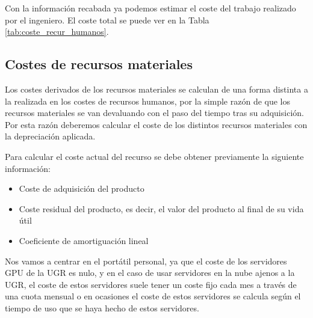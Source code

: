 Con la información recabada ya podemos estimar el coste del trabajo realizado por el ingeniero. El coste total se puede ver en la Tabla \ref{tab:coste_recur_humanos}.

\begin{table}[h]
\centering
{}
\caption{Costes asociados a los recursos humanos}
\label{tab:coste_recur_humanos}
\end{table}

\subsection{Costes de recursos materiales}

Los costes derivados de los recursos materiales se calculan de una forma distinta a la realizada en los costes de recursos humanos, por la simple razón de que los recursos materiales se van devaluando con el paso del tiempo tras su adquisición. Por esta razón deberemos calcular el coste de los distintos recursos materiales con la depreciación aplicada.

Para calcular el coste actual del recurso se debe obtener previamente la siguiente información:

\begin{itemize}
\item Coste de adquisición del producto
\item Coste residual del producto, es decir, el valor del producto al final de su vida útil
\item Coeficiente de amortiguación lineal
\end{itemize}

Nos vamos a centrar en el portátil personal, ya que el coste de los servidores GPU de la UGR es nulo, y en el caso de usar servidores en la nube ajenos a la UGR, el coste de estos servidores suele tener un coste fijo cada mes a través de una cuota mensual o en ocasiones el coste de estos servidores se calcula según el tiempo de uso que se haya hecho de estos servidores.

